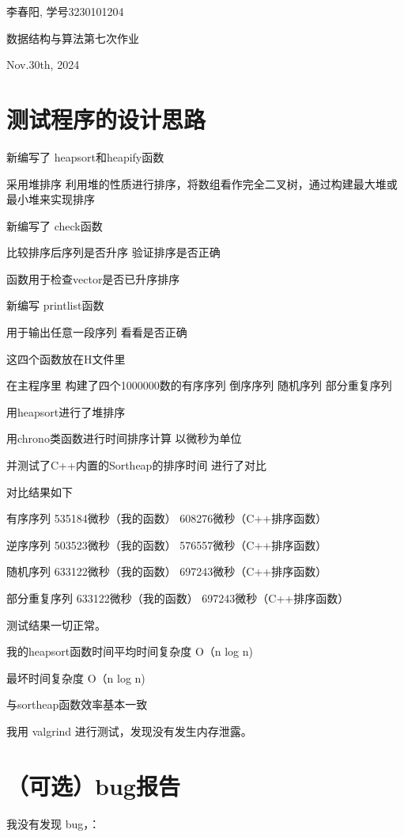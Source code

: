 \documentclass[UTF8]{ctexart}
\begin{document}
李春阳, 学号3230101204

{数据结构与算法第七次作业}

Nov.30th, 2024

\section{测试程序的设计思路}

新编写了 heapsort和heapify函数

采用堆排序 利用堆的性质进行排序，将数组看作完全二叉树，通过构建最大堆或最小堆来实现排序

新编写了 check函数

比较排序后序列是否升序 验证排序是否正确

函数用于检查vector是否已升序排序

新编写 printlist函数

用于输出任意一段序列 看看是否正确

这四个函数放在H文件里

在主程序里 构建了四个1000000数的有序序列 倒序序列 随机序列 部分重复序列

用heapsort进行了堆排序

用chrono类函数进行时间排序计算  以微秒为单位

并测试了C++内置的Sortheap的排序时间 进行了对比

对比结果如下

有序序列    535184微秒（我的函数）  608276微秒（C++排序函数）

逆序序列    503523微秒（我的函数）  576557微秒（C++排序函数）

随机序列    633122微秒（我的函数）  697243微秒（C++排序函数）

部分重复序列    633122微秒（我的函数）  697243微秒（C++排序函数）

测试结果一切正常。

我的heapsort函数时间平均时间复杂度 O（n log n)

最坏时间复杂度 O（n log n)

与sortheap函数效率基本一致 

我用 valgrind 进行测试，发现没有发生内存泄露。

\section{（可选）bug报告}

我没有发现 bug，：
\end{document}
